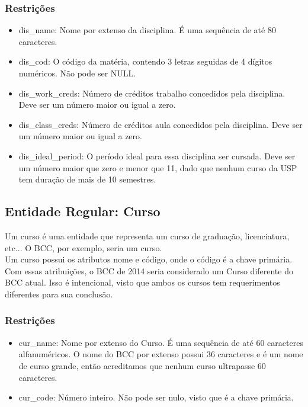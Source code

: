 \documentclass{article}
\begin{document}
  	    \subsubsection{Restrições}
  	        \begin{itemize}
  		        \item dis\_name: Nome por extenso da disciplina. É uma sequência de até 80 caracteres.
  		        \item dis\_cod: O código da matéria, contendo 3 letras seguidas de 4 dígitos numéricos. Não pode ser NULL.
  		        \item dis\_work\_creds: Número de créditos trabalho concedidos pela disciplina. Deve ser um número maior ou igual a zero.
  		        \item dis\_class\_creds: Número de créditos aula concedidos pela disciplina. Deve ser um número maior ou igual a zero.
  		        \item dis\_ideal\_period: O período ideal para essa disciplina ser cursada. Deve ser um número maior que zero e menor que 11, dado que nenhum curso da USP tem duração de mais de 10 semestres.
  		    \end{itemize}
  		    
  	\subsection{Entidade Regular: Curso}
  	    \quad Um curso é uma entidade que representa um curso de graduação, licenciatura, etc... O BCC, por exemplo, seria um curso. \\
  	    \quad Um curso possui os atributos nome e código, onde o código é a chave primária. Com essas atribuições, o BCC de 2014 seria considerado um Curso diferente do BCC atual. Isso é intencional, visto que ambos os cursos tem requerimentos diferentes para sua conclusão.
  	    \subsubsection{Restrições}
  	        \begin{itemize}
  	            \item cur\_name: Nome por extenso do Curso. É uma sequência de até 60 caracteres alfanuméricos. O nome do BCC por extenso possui 36 caracteres e é um nome de curso grande, então acreditamos que nenhum curso ultrapasse 60 caracteres.
  	            \item cur\_code: Número inteiro. Não pode ser nulo, visto que é a chave primária.
  		    \end{itemize}
  	
\end{document}
